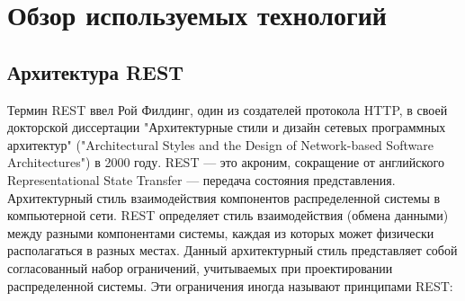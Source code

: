 \section{Обзор используемых технологий}

\subsection{Архитектура REST}
Термин REST ввел Рой Филдинг, один из создателей протокола HTTP, в своей докторской диссертации "Архитектурные стили и дизайн сетевых программных архитектур" ("Architectural Styles and the Design of Network-based Software Architectures")\cite{1} в 2000 году. REST — это акроним, сокращение от английского Representational State Transfer — передача состояния представления. Архитектурный стиль взаимодействия компонентов распределенной системы в компьютерной сети. REST определяет стиль взаимодействия (обмена данными) между разными компонентами системы, каждая из которых может физически располагаться в разных местах.
Данный архитектурный стиль представляет собой согласованный набор ограничений, учитываемых при проектировании распределенной системы. Эти ограничения иногда называют принципами REST:
